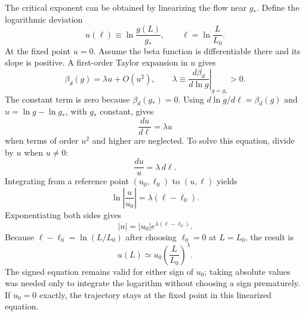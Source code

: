 \documentclass[11pt,a4paper]{article}
\numberwithin{equation}{section}
\begin{document}
The critical exponent can be obtained by linearizing the flow near $g_*$. Define the logarithmic deviation
\begin{equation}
    u(\ell)\equiv\ln\frac{g(L)}{g_*},
    \qquad \ell=\ln\frac{L}{L_0}.
\end{equation}
At the fixed point $u=0$. Assume the beta function is differentiable there and its slope is positive. A first-order Taylor expansion in $u$ gives
\begin{equation}
    \beta_d(g)=\lambda u+O(u^2),
    \qquad
    \lambda\equiv\left.\frac{d\beta_d}{d\ln g}\right|_{g=g_*}>0.
    \label{eq:beta-linear}
\end{equation}
The constant term is zero because $\beta_d(g_*)=0$. Using $d\ln g/d\ell=\beta_d(g)$ and $u=\ln g-\ln g_*$, with $g_*$ constant, gives
\begin{equation}
    \frac{du}{d\ell}=\lambda u
\end{equation}
when terms of order $u^2$ and higher are neglected. To solve this equation, divide by $u$ when $u\ne0$:
\begin{equation}
    \frac{du}{u}=\lambda\,d\ell.
\end{equation}
Integrating from a reference point $(u_0,\ell_0)$ to $(u,\ell)$ yields
\begin{equation}
    \ln\left|\frac{u}{u_0}\right|=\lambda(\ell-\ell_0).
\end{equation}
Exponentiating both sides gives
\begin{equation}
    |u|=|u_0|e^{\lambda(\ell-\ell_0)}.
\end{equation}
Because $\ell-\ell_0=\ln(L/L_0)$ after choosing $\ell_0=0$ at $L=L_0$, the result is
\begin{equation}
    u(L)\simeq u_0\left(\frac{L}{L_0}\right)^\lambda.
    \label{eq:u-flow}
\end{equation}
The signed equation remains valid for either sign of $u_0$; taking absolute values was needed only to integrate the logarithm without choosing a sign prematurely. If $u_0=0$ exactly, the trajectory stays at the fixed point in this linearized equation.
\end{document}
